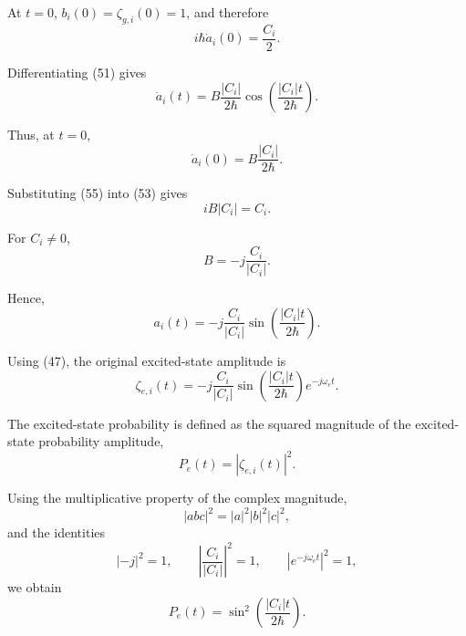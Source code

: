 \documentclass[12pt,a4paper]{article}
\begin{document}
At $t=0$, $b_i(0)=\zeta_{g,i}(0)=1$, and therefore
\begin{equation}
i\hbar\dot a_i(0)=\frac{C_i}{2}.
\tag{53}
\end{equation}

Differentiating (51) gives
\begin{equation}
\dot a_i(t)
=
B\frac{|C_i|}{2\hbar}
\cos\left(\frac{|C_i|t}{2\hbar}\right).
\tag{54}
\end{equation}

Thus, at $t=0$,
\begin{equation}
\dot a_i(0)=B\frac{|C_i|}{2\hbar}.
\tag{55}
\end{equation}

Substituting (55) into (53) gives
\begin{equation}
iB|C_i|=C_i.
\tag{56}
\end{equation}

For $C_i\neq0$,
\begin{equation}
B=-j\frac{C_i}{|C_i|}.
\tag{57}
\end{equation}

Hence,
\begin{equation}
a_i(t)
=
-j\frac{C_i}{|C_i|}
\sin\left(\frac{|C_i|t}{2\hbar}\right).
\tag{58}
\end{equation}

Using (47), the original excited-state amplitude is
\begin{equation}
\zeta_{e,i}(t)
=
-j\frac{C_i}{|C_i|}
\sin\left(\frac{|C_i|t}{2\hbar}\right)e^{-j\omega_e t}.
\tag{59}
\end{equation}

The excited-state probability is defined as the squared magnitude of
the excited-state probability amplitude,
\begin{equation}
P_e(t)=|\zeta_{e,i}(t)|^2.
\tag{60}
\end{equation}

Using the multiplicative property of the complex magnitude,
\begin{equation}
|abc|^2=|a|^2|b|^2|c|^2,
\tag{61}
\end{equation}
and the identities
\begin{equation}
|-j|^2=1,
\qquad
\left|\frac{C_i}{|C_i|}\right|^2=1,
\qquad
|e^{-j\omega_e t}|^2=1,
\tag{62}
\end{equation}
we obtain
\begin{equation}
P_e(t)
=
\sin^2\left(\frac{|C_i|t}{2\hbar}\right).
\tag{63}
\end{equation}
\end{document}
